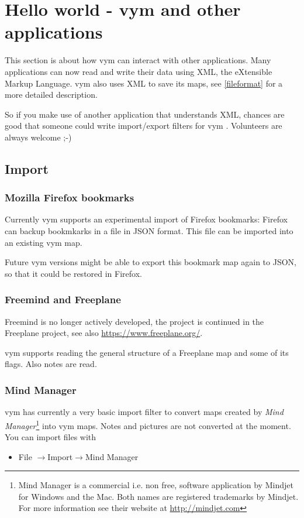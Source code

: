 \documentclass[12pt,a4paper]{article}
\newcommand{\vym}{{\sc vym }}
\newcommand{\ra}{$\longrightarrow$}
\begin{document}
\section{Hello world - vym and other applications}
This section is about how \vym can interact with other applications.
Many applications can now read and write their data using XML, the
eXtensible Markup Language. \vym also uses XML to save its maps, see
\ref{fileformat} for a more detailed description. 

So if you make use of another application that understands XML, chances
are good that someone could write import/export filters for \vym.
Volunteers are always welcome ;-)

\subsection{Import} \label{import}

\subsubsection{Mozilla Firefox bookmarks}
Currently \vym supports an experimental import of Firefox bookmarks:
Firefox can backup bookmkarks in a file in JSON format. This file can be
imported into an existing \vym map.

Future \vym versions might be able to export this bookmark map again to JSON, so
that it could be restored in Firefox.

\subsubsection{Freemind and Freeplane}
Freemind is no longer actively developed, the project is continued in
the Freeplane project, see also
\href{https://www.freeplane.org/}{https://www.freeplane.org/}.

\vym supports reading the general structure of a Freeplane map and some
of its flags. Also notes are read.

\subsubsection{Mind Manager}
\vym has currently a very basic import filter to convert maps created by
{\em Mind Manager}\footnote{Mind Manager is a commercial i.e. non free,
software application by Mindjet for Windows and the Mac. Both names are
registered trademarks by Mindjet. For more information see their website
at \href{http://mindjet.com}{http://mindjet.com}} into \vym maps. Notes
and pictures are not converted at the moment. You can import files with
\begin{itemize}
    \item File \ra Import\ra Mind Manager
\end{itemize}
\end{document}
